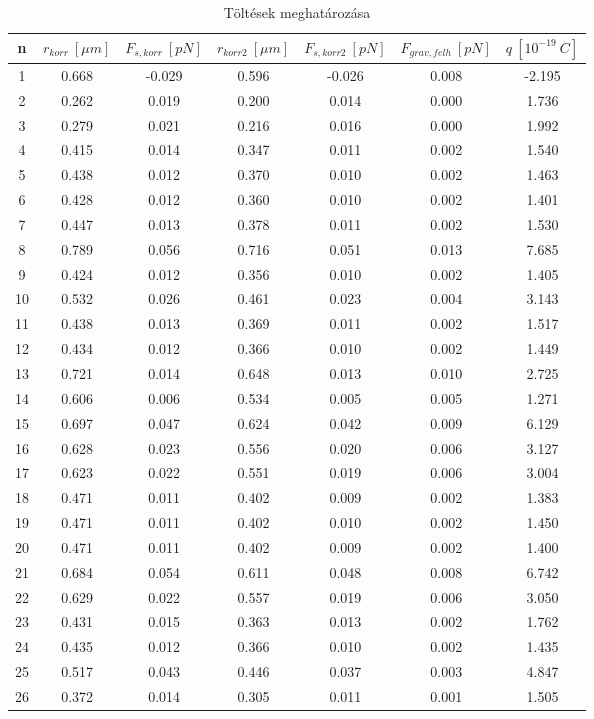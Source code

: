 \documentclass[a4paper]{article}
\begin{document}
\begin{table}[h!]\centering
	\caption{Töltések meghatározása}
	\vspace{0.3cm}
	\begin{tabular}{|c|c|c|c|c|c|c|}
		
		\hline
		n & $r_{korr}\ [\mu m]$ & $F_{s,korr}\ [pN]$ & $r_{korr2}\ [\mu m]$ & $F_{s,korr2}\ [pN]$  & $F_{grav,felh}\ [pN]$ & $q\ [10^{-19}\ C]$ \\ \hline
		1 & 0.668 & -0.029 & 0.596 & -0.026 & 0.008 & -2.195 \\ \hline
		2 & 0.262 & 0.019 & 0.200 & 0.014 & 0.000 & 1.736 \\ \hline
		3 & 0.279 & 0.021 & 0.216 & 0.016 & 0.000 & 1.992 \\ \hline
		4 & 0.415 & 0.014 & 0.347 & 0.011 & 0.002 & 1.540 \\ \hline
		5 & 0.438 & 0.012 & 0.370 & 0.010 & 0.002 & 1.463 \\ \hline
		6 & 0.428 & 0.012 & 0.360 & 0.010 & 0.002 & 1.401 \\ \hline
		7 & 0.447 & 0.013 & 0.378 & 0.011 & 0.002 & 1.530 \\ \hline
		8 & 0.789 & 0.056 & 0.716 & 0.051 & 0.013 & 7.685 \\ \hline
		9 & 0.424 & 0.012 & 0.356 & 0.010 & 0.002 & 1.405 \\ \hline
		10 & 0.532 & 0.026 & 0.461 & 0.023 & 0.004 & 3.143 \\ \hline
		11 & 0.438 & 0.013 & 0.369 & 0.011 & 0.002 & 1.517 \\ \hline
		12 & 0.434 & 0.012 & 0.366 & 0.010 & 0.002 & 1.449 \\ \hline
		13 & 0.721 & 0.014 & 0.648 & 0.013 & 0.010 & 2.725 \\ \hline
		14 & 0.606 & 0.006 & 0.534 & 0.005 & 0.005 & 1.271 \\ \hline
		15 & 0.697 & 0.047 & 0.624 & 0.042 & 0.009 & 6.129 \\ \hline
		16 & 0.628 & 0.023 & 0.556 & 0.020 & 0.006 & 3.127 \\ \hline
		17 & 0.623 & 0.022 & 0.551 & 0.019 & 0.006 & 3.004 \\ \hline
		18 & 0.471 & 0.011 & 0.402 & 0.009 & 0.002 & 1.383 \\ \hline
		19 & 0.471 & 0.011 & 0.402 & 0.010 & 0.002 & 1.450 \\ \hline
		20 & 0.471 & 0.011 & 0.402 & 0.009 & 0.002 & 1.400 \\ \hline
		21 & 0.684 & 0.054 & 0.611 & 0.048 & 0.008 & 6.742 \\ \hline
		22 & 0.629 & 0.022 & 0.557 & 0.019 & 0.006 & 3.050 \\ \hline
		23 & 0.431 & 0.015 & 0.363 & 0.013 & 0.002 & 1.762 \\ \hline
		24 & 0.435 & 0.012 & 0.366 & 0.010 & 0.002 & 1.435 \\ \hline
		25 & 0.517 & 0.043 & 0.446 & 0.037 & 0.003 & 4.847 \\ \hline
		26 & 0.372 & 0.014 & 0.305 & 0.011 & 0.001 & 1.505 \\ \hline
	\end{tabular}
	
\end{table}
\end{document}
